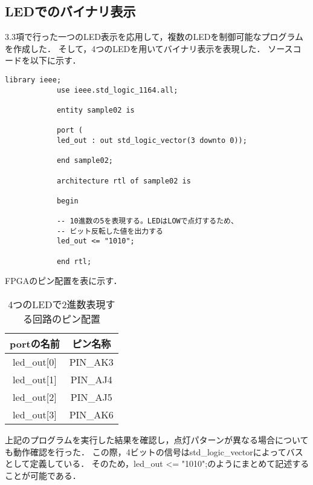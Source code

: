 \documentclass{ltjsarticle}
\begin{document}
	\subsection{LEDでのバイナリ表示}
		3.3項で行った一つのLED表示を応用して，複数のLEDを制御可能なプログラムを作成した．
		そして，4つのLEDを用いてバイナリ表示を表現した．
		ソースコードを以下に示す．

		\begin{lstlisting}[caption=sample2, label=code:sample2]
			library ieee;
			use ieee.std_logic_1164.all;

			entity sample02 is

			port (
			led_out : out std_logic_vector(3 downto 0));

			end sample02;

			architecture rtl of sample02 is

			begin

			-- 10進数の5を表現する。LEDはLOWで点灯するため、
			-- ビット反転した値を出力する
			led_out <= "1010";

			end rtl;

		\end{lstlisting}

		FPGAのピン配置を表に示す．

		\begin{table}[H]
		\begin{center}
		\caption{4つのLEDで2進数表現する回路のピン配置}
		\label{tab:LED4}
		\begin{tabular}{cc} \toprule
			portの名前 & ピン名称 \\ \hline
			led\_out[0] & PIN\_AK3 \\
			led\_out[1] & PIN\_AJ4 \\
			led\_out[2] & PIN\_AJ5 \\
			led\_out[3] & PIN\_AK6 \\
			\bottomrule
		\end{tabular}
		\end{center}
		\end{table}

		上記のプログラムを実行した結果を確認し，点灯パターンが異なる場合についても動作確認を行った．
		この際，4ビットの信号はstd\_logic\_vectorによってバスとして定義している．
		そのため，led\_out <= "1010";のようにまとめて記述することが可能である．
\end{document}
